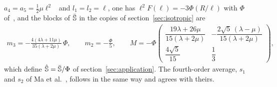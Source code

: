 $a_4=a_5=\tfrac12\mu\ell^2$~\cite[eq.~(4.3)]{Ma2018} and $l_1=l_2=\ell$, one has
$\ell^2F(\ell)=-3\Phi(R/\ell)$ with $\Phi$ of~\cite[eq.~(21)]{Solyaev2023}, and the blocks
of $\bar{\mathbb{S}}$ in the copies of section~\ref{sec:isotropic} are
\begin{equation}
\begin{gathered}
m_3=-\frac{4(4\lambda+11\mu)}{35(\lambda+2\mu)}\,\Phi,\qquad m_2=-\frac{\Phi}{5},\qquad
M=-\Phi\begin{pmatrix}\dfrac{19\lambda+26\mu}{15(\lambda+2\mu)}&
-\dfrac{2\sqrt5\,(\lambda-\mu)}{15(\lambda+2\mu)}\\[1.5ex]
\dfrac{4\sqrt5}{15}&\dfrac13\end{pmatrix},
\end{gathered}\label{eq:esh-helmholtz}
\end{equation}
which define $\hat{\mathbb{S}}=\bar{\mathbb{S}}/\Phi$ of section~\ref{sec:application}. The fourth-order
average, $s_1$ and $s_2$ of Ma et al.~\cite[eq.~(3.19)]{Ma2018}, follows in the same way and
agrees with theirs.

